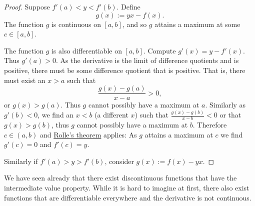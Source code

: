 \begin{proof}
Suppose 
$f'(a) < y < f'(b)$.
Define
\begin{equation*}
g(x) := yx - f(x) .
\end{equation*}
The function $g$ is continuous on $[a,b]$, and so $g$ attains a maximum at some $c \in
[a,b]$.

The function $g$ is also differentiable on $[a,b]$.
Compute $g'(x) = y-f'(x)$.  Thus $g'(a) > 0$.  As the derivative is
the limit of difference quotients and is positive, there must be some
difference quotient that is positive.  That is, there must exist
an $x > a$ such that
\begin{equation*}
\frac{g(x)-g(a)}{x-a} > 0 ,
\end{equation*}
or $g(x) > g(a)$.  Thus $g$
cannot possibly have a maximum at $a$.  Similarly as $g'(b) < 0$,
we find an $x < b$ (a different $x$) such that
$\frac{g(x)-g(b)}{x-b} < 0$ or that $g(x) > g(b)$, thus
$g$ cannot possibly have a maximum at $b$.
Therefore $c \in (a,b)$
and \hyperref[thm:rolle]{Rolle's theorem} applies: As $g$ attains a maximum
at $c$ we find $g'(c) = 0$
and $f'(c) = y$.

Similarly if $f'(a) > y > f'(b)$, consider $g(x) := f(x)- yx$.
\end{proof}

We have seen already that
there exist discontinuous functions that have the
intermediate value property.  While it is hard to imagine at first, there
also
exist functions that are differentiable everywhere and the derivative is not
continuous.

